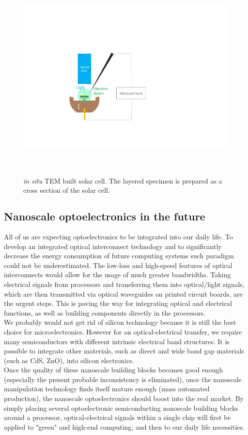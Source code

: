 \begin{figure}  
\centering
\includegraphics[height=300pt, angle=-90]{figures/figure7_sc}
\caption[Solar cell.]{\textit{in situ} TEM built solar cell. The layered specimen is prepared as a cross section of the solar cell.
\label{fig:7_sc}}
\end{figure}

\subsection{Nanoscale optoelectronics in the future}
All of us are expecting optoelectronics to be integrated into our daily life. To develop an integrated optical interconnect technology and to significantly decrease the energy consumption of future computing systems such paradigm could not be underestimated. The low-loss and high-speed features of optical interconnects would allow for the usage of much greater bandwidths. Taking electrical signals from processors and transferring them into optical/light signals, which are then transmitted via optical waveguides on printed circuit boards, are the urgent steps. This is paving the way for integrating optical and electrical functions, as well as building components directly in the processors. \\
We probably would not get rid of silicon technology because it is still the best choice for microelectronics. However for an optical-electrical transfer, we require many semiconductors with different intrinsic electrical band structures. It is possible to integrate other materials, such as direct and wide band gap materials (such as CdS, ZnO), into silicon electronics. \\
Once the quality of these nanoscale building blocks becomes good enough (especially the present probable inconsistency is eliminated), once the nanoscale manipulation technology finds itself mature enough (mass automated production), the nanoscale optoelectronics should boost into the real market. By simply placing several optoelectronic semiconducting nanoscale building blocks around a processor, optical-electrical signals within a single chip will first be applied to "green" and high-end computing, and then to our daily life necessities. 

